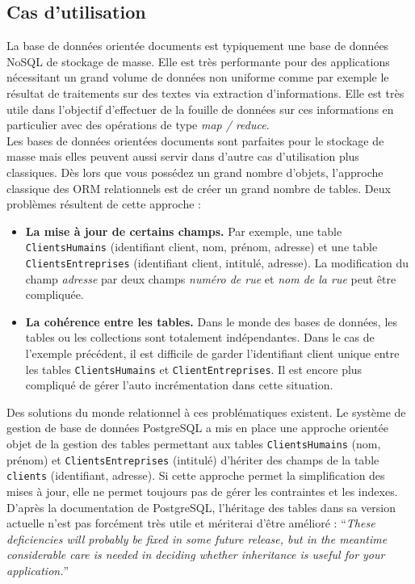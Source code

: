 \subsection{Cas d'utilisation}

  La base de données orientée documents est typiquement une base de données NoSQL de stockage de masse. Elle est très performante pour des applications nécessitant un grand volume de données non uniforme comme par exemple le résultat de traitements sur des textes via extraction d'informations. Elle est très utile dans l'objectif d'effectuer de la fouille de données sur ces informations en particulier avec des opérations de type \textit{map / reduce}.\\

  Les bases de données orientées documents sont parfaites pour le stockage de masse mais elles peuvent aussi servir dans d'autre cas d'utilisation plus classiques. Dès lors que vous possédez un grand nombre d'objets, l'approche classique des ORM relationnels est de créer un grand nombre de tables. Deux problèmes résultent de cette approche : \\
  \begin{itemize}
    \item \textbf{La mise à jour de certains champs.} Par exemple, une table \texttt{ClientsHumains} (identifiant client, nom, prénom, adresse) et une table \texttt{ClientsEntreprises} (identifiant client, intitulé, adresse). La modification du champ \textit{adresse} par deux champs \textit{numéro de rue} et \textit{nom de la rue} peut être compliquée.
    \item \textbf{La cohérence entre les tables.} Dans le monde des bases de données, les tables ou les collections sont totalement indépendantes. Dans le cas de l'exemple précédent, il est difficile de garder l'identifiant client unique entre les tables \texttt{ClientsHumains} et \texttt{ClientEntreprises}. Il est encore plus compliqué de gérer l'auto incrémentation dans cette situation.
  \end{itemize}

  \vspace{10px}

  Des solutions du monde relationnel à ces problématiques existent. Le système de gestion de base de données PostgreSQL a mis en place une approche orientée objet de la gestion des tables permettant aux tables \texttt{ClientsHumains} (nom, prénom) et \texttt{ClientsEntreprises} (intitulé) d'hériter des champs de la table \texttt{clients} (identifiant, adresse). Si cette approche permet la simplification des mises à jour, elle ne permet toujours pas de gérer les contraintes et les indexes. D'après la documentation de PostgreSQL, l'héritage des tables dans sa version actuelle n'est pas forcément très utile et mériterai d'être amélioré :
  \enquote{\textit{These deficiencies will probably be fixed in some future release, but in the meantime considerable care is needed in deciding whether inheritance is useful for your application.}}\cite{Postgre_inheritance}\\


